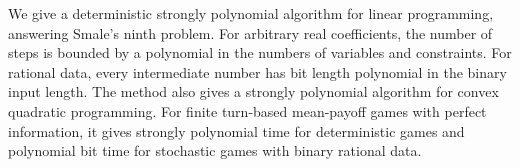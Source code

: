 We give a deterministic strongly polynomial algorithm for linear programming,
answering Smale's ninth problem. For arbitrary real coefficients, the number of
steps is bounded by a polynomial in the numbers of variables and constraints.
For rational data, every intermediate number has bit length polynomial in the binary input length.
The method also gives a strongly polynomial algorithm for convex quadratic
programming. For finite turn-based mean-payoff games with perfect information,
it gives strongly polynomial time for deterministic games and polynomial bit
time for stochastic games with binary rational data.
